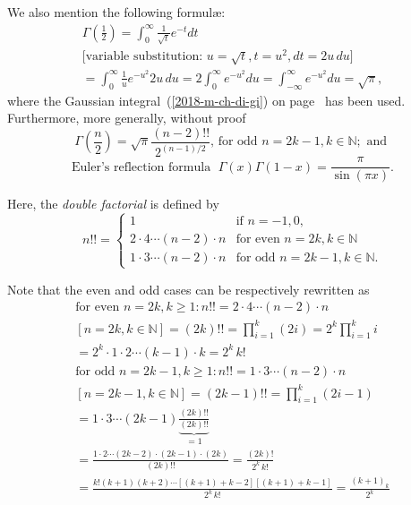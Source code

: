 We also mention the following formul\ae:
\begin{equation}
\begin{split}
\Gamma \left( \frac{1}{2} \right)
=\int_0^\infty  \frac{1}{\sqrt{t}} e^{-t} dt \\
\text{[variable substitution: }
u=\sqrt{t}, t=u^2, dt=2u\,du\textrm{]}\\
=\int_0^\infty  \frac{1}{u} e^{-u^2} 2u \, du
=2\int_0^\infty   e^{-u^2} du
=\int_{-\infty}^\infty   e^{-u^2} du
=\sqrt{\pi } ,
\end{split}
\end{equation}
where the Gaussian integral~(\ref{2018-m-ch-di-gi}) on page~\pageref{2018-m-ch-di-gi}  has been used.
Furthermore, more generally, without proof
\begin{equation}
\Gamma \left( \frac{n}{2}\right)=\sqrt{\pi }\frac{( n-2)!!}{2^{(n-1)/2}} \textrm{, for  odd } n= 2k-1, k\in \mathbb{N}; \textrm {  and }
\end{equation}
\begin{equation}
\text{Euler's reflection formula }\; \Gamma ( x)\Gamma ( 1-x) =\frac{\pi}{\sin (\pi x)} .
\end{equation}



Here, the
{\em  double factorial}
 is defined by
\begin{equation}
n!!=
\begin{cases}
1   & \text{if } n=-1,0,  \\
2\cdot 4\cdots (n-2)\cdot n&\text{for even }   n= 2k ,  k\in \mathbb{N} \\
1\cdot 3 \cdots (n-2) \cdot  n &\text{for odd }  n= 2k-1 ,  k\in \mathbb{N} .
\end{cases}
\end{equation}

Note that the even and odd cases can be respectively rewritten as
\begin{equation}
\begin{split}
\text{for even }   n= 2k ,  k\ge 1:
n!!= 2\cdot 4\cdots (n-2)\cdot n\\
[n= 2k, k\in\mathbb{N}] =  (2k)!!
  =  \prod_{i=1}^k (2i)= 2^{k} \prod_{i=1}^k i\\
  =  2^{k}\cdot  1\cdot 2\cdots (k-1)\cdot k = 2^k\, k!
\\
\text{for odd }  n= 2k-1 ,  k\ge 1:
n!!= 1\cdot 3 \cdots (n-2) \cdot  n \\
[n= 2k-1, k\in\mathbb{N}] =(2k-1)!!
 =  \prod_{i=1}^k (2i-1) \\
  = 1\cdot 3 \cdots  (2k-1)  \underbrace{\frac{(2k)!!}{(2k)!!}}_{=1}    \\
  = \frac{1\cdot 2 \cdots (2k-2) \cdot  (2k-1)\cdot  (2k)}{(2k)!!}   =  \frac{(2k)!}{2^k \,k!}\\
  = \frac{k! (k+1)(k+2) \cdots [(k+1)+k-2][(k+1)+k-1] }{2^k \,k!}
  =  \frac{(k+1)_k }{2^k }
\end{split}
\end{equation}


